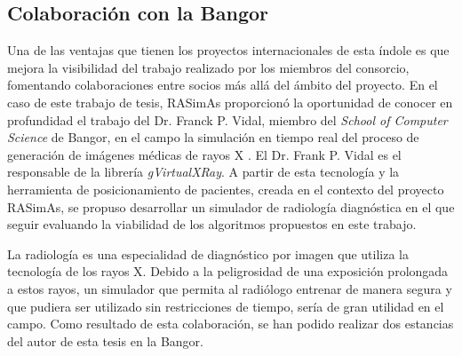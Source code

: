 \subsection{Colaboración con la \acl{Bangor}}
%
Una de las ventajas que tienen los proyectos internacionales de esta índole es que mejora la visibilidad del trabajo realizado por los miembros del consorcio, fomentando colaboraciones entre socios más allá del ámbito del proyecto.
%
En el caso de este trabajo de tesis, \ac{RASimAs} proporcionó la oportunidad de conocer en profundidad el trabajo del  Dr. Franck P. Vidal, miembro del  \emph{School of Computer Science} de \acl{Bangor}, en el campo la simulación en tiempo real del proceso de generación de imágenes médicas de rayos X \cite{villard2014interventional}. El Dr. Frank P. Vidal es el responsable de la librería \emph{gVirtualXRay}\cite{sujar:hal}.
%
A partir de esta tecnología y la herramienta de posicionamiento de pacientes, creada en el contexto del proyecto \ac{RASimAs}, se propuso desarrollar un simulador de radiología diagnóstica en el que seguir evaluando la viabilidad de los algoritmos propuestos en este trabajo.

La radiología es una especialidad de diagnóstico por imagen que utiliza la tecnología de los rayos X. Debido a la peligrosidad de una exposición prolongada a estos rayos, un simulador que permita al radiólogo entrenar de manera segura y que pudiera ser utilizado sin restricciones de tiempo, sería de gran utilidad en el campo.
Como resultado de esta colaboración, se han podido realizar dos estancias del autor de esta tesis en la \acl{Bangor}. 






